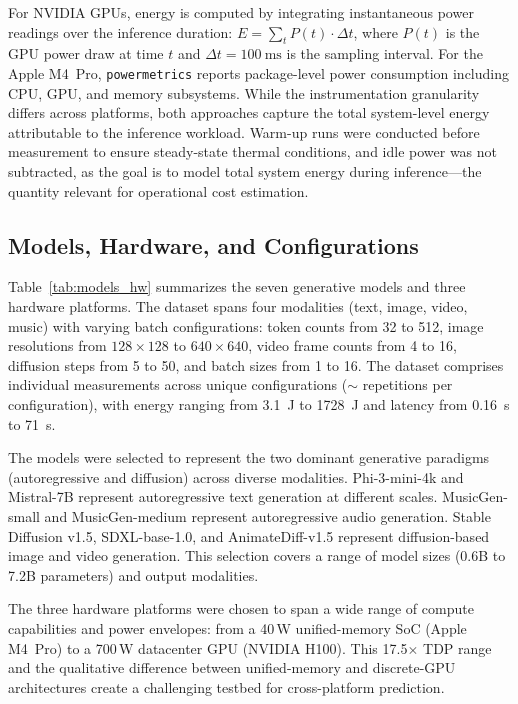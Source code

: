 \documentclass[review,12pt,authoryear]{elsarticle}
\begin{document}
For NVIDIA GPUs, energy is computed by integrating instantaneous power readings over the inference duration: $E = \sum_{t} P(t) \cdot \Delta t$, where $P(t)$ is the GPU power draw at time $t$ and $\Delta t = \SI{100}{\milli\second}$ is the sampling interval.
For the Apple M4~Pro, \texttt{powermetrics} reports package-level power consumption including CPU, GPU, and memory subsystems.
While the instrumentation granularity differs across platforms, both approaches capture the total system-level energy attributable to the inference workload.
Warm-up runs were conducted before measurement to ensure steady-state thermal conditions, and idle power was not subtracted, as the goal is to model total system energy during inference---the quantity relevant for operational cost estimation.

\subsection{Models, Hardware, and Configurations}
\label{sec:models_hw}
Table~\ref{tab:models_hw} summarizes the seven generative models and three hardware platforms.
The dataset spans four modalities (text, image, video, music) with varying batch configurations: token counts from 32 to 512, image resolutions from $128{\times}128$ to $640{\times}640$, video frame counts from 4 to 16, diffusion steps from 5 to 50, and batch sizes from 1 to 16.
The dataset comprises \unskip{} individual measurements across \unskip{} unique configurations (${\sim}$\unskip{} repetitions per configuration), with energy ranging from \SI{3.1}{\joule} to \SI{1728}{\joule} and latency from \SI{0.16}{\second} to \SI{71}{\second}.

The models were selected to represent the two dominant generative paradigms (autoregressive and diffusion) across diverse modalities.
Phi-3-mini-4k and Mistral-7B represent autoregressive text generation at different scales.
MusicGen-small and MusicGen-medium represent autoregressive audio generation.
Stable Diffusion v1.5, SDXL-base-1.0, and AnimateDiff-v1.5 represent diffusion-based image and video generation.
This selection covers a range of model sizes (0.6B to 7.2B parameters) and output modalities.

The three hardware platforms were chosen to span a wide range of compute capabilities and power envelopes: from a 40\,W unified-memory SoC (Apple M4~Pro) to a 700\,W datacenter GPU (NVIDIA H100).
This 17.5$\times$ TDP range and the qualitative difference between unified-memory and discrete-GPU architectures create a challenging testbed for cross-platform prediction.
\end{document}
